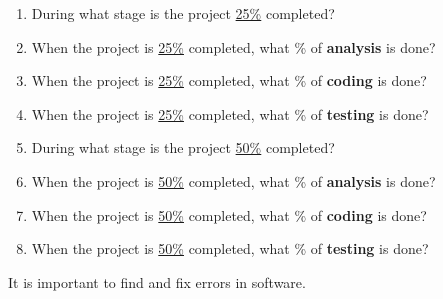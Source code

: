 \begin{enumerate}%

\setlength{\defaultwidth}{11em}

\item During what stage is the project \underline{25\%} completed?

\item When the project is \underline{25\%} completed, what \% of \textbf{analysis} is done?

\item When the project is \underline{25\%} completed, what \% of \textbf{coding} is done?

\item When the project is \underline{25\%} completed, what \% of \textbf{testing} is done?

\item During what stage is the project \underline{50\%} completed?

\item When the project is \underline{50\%} completed, what \% of \textbf{analysis} is done?

\item When the project is \underline{50\%} completed, what \% of \textbf{coding} is done?

\item When the project is \underline{50\%} completed, what \% of \textbf{testing} is done?

\end{enumerate}


\vspace{1ex}

\newpage


\Q It is important to find and fix errors in software.

